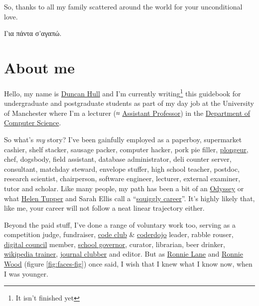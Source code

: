 \documentclass[
]{book}
\begin{document}
So, thanks to all my family scattered around the world for your unconditional love.

Για πάντα σ'αγαπώ. 🙏

\hypertarget{duncan}{%
\section{About me}\label{duncan}}

Hello, my name is \href{https://personalpages.manchester.ac.uk/staff/duncan.hull/}{Duncan Hull} and I'm currently writing\footnote{It isn't finished yet} this guidebook for undergraduate and postgraduate students as part of my day job at the University of Manchester where I'm a lecturer (≈ \href{https://en.wikipedia.org/wiki/Assistant_professor}{Assistant Professor}) in the \href{https://www.cs.manchester.ac.uk/}{Department of Computer Science}.

So what's \emph{my} story? I've been gainfully employed as a paperboy, supermarket cashier, shelf stacker, sausage packer, computer hacker, pork pie filler, \href{https://en.wikipedia.org/wiki/Plongeur}{plongeur}, chef, dogsbody, field assistant, database administrator, deli counter server, consultant, matchday steward, envelope stuffer, high school teacher, postdoc, research scientist, chairperson, software engineer, lecturer, external examiner, tutor and scholar. Like many people, my path has been a bit of an \href{https://en.wikipedia.org/wiki/Odyssey}{Odyssey} or what \href{https://twitter.com/HelenTupper}{Helen Tupper} and Sarah Ellis call a ``\href{https://www.amazingif.com/books/}{squiggly career}''. \citep{squigglybook} It's highly likely that, like me, your career will not follow a neat linear trajectory either. \citep{squigglytalk}

Beyond the paid stuff, I've done a range of voluntary work too, serving as a competition judge, fundraiser, \href{https://codeclub.org}{code club} \& \href{https://coderdojo.com}{coderdojo} leader, rabble rouser, \href{https://www.manchesterdigital.com/}{digital council} member, \href{https://governorsforschools.org.uk/}{school governor}, curator, librarian, beer drinker, \href{https://wiki-loves-scientists.org.uk/}{wikipedia trainer}, \href{https://sigcse.cs.manchester.ac.uk/}{journal clubber} and editor. But as \href{https://en.wikipedia.org/wiki/Ronnie_Lane}{Ronnie Lane} and \href{https://en.wikipedia.org/wiki/Ronnie_Wood}{Ronnie Wood} (figure \ref{fig:faces-fig}) once said, I wish that I knew what I know now, when I was younger.
\end{document}
